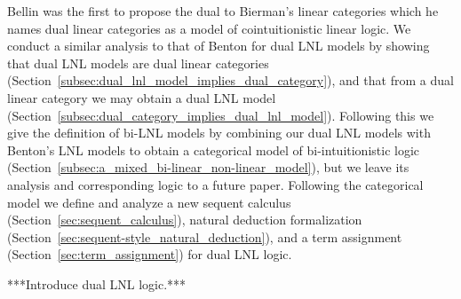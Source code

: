 Bellin \cite{Bellin:2012} was the first to propose the dual to
Bierman's \cite{Bierman:1994} linear categories which he names dual
linear categories as a model of cointuitionistic linear logic.  We
conduct a similar analysis to that of Benton for dual LNL models by
showing that dual LNL models are dual linear categories
(Section~\ref{subsec:dual_lnl_model_implies_dual_category}), and that
from a dual linear category we may obtain a dual LNL model
(Section~\ref{subsec:dual_category_implies_dual_lnl_model}).
Following this we give the definition of bi-LNL models by combining
our dual LNL models with Benton's LNL models to obtain a categorical
model of bi-intuitionistic logic
(Section~\ref{subsec:a_mixed_bi-linear_non-linear_model}), but we
leave its analysis and corresponding logic to a future paper.
Following the categorical model we define and analyze a new sequent
calculus (Section~\ref{sec:sequent_calculus}), natural deduction
formalization (Section~\ref{sec:sequent-style_natural_deduction}), and
a term assignment (Section~\ref{sec:term_assignment}) for dual LNL
logic.

***Introduce dual LNL logic.***

